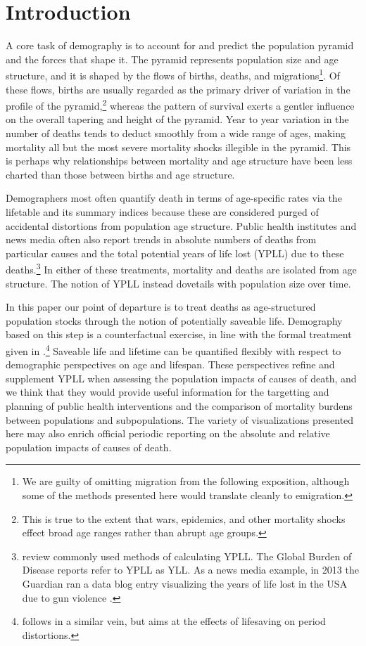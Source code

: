 \documentclass{article}
\begin{document}
\section*{Introduction}
A core task of demography is to account for and predict the population
pyramid and the forces that shape it. The pyramid represents population
size and age structure, and it is shaped by the flows of births,
deaths, and migrations\footnote{We are guilty of omitting migration from
the following exposition, although some of the methods presented here would
translate cleanly to emigration.}. Of these flows, births are usually regarded
as the primary driver of variation in the profile of the pyramid,\footnote{This
is true to the extent that wars, epidemics, and other mortality shocks effect
broad age ranges rather than abrupt age groups.} whereas the pattern of survival
exerts a gentler influence on the overall tapering and height of the pyramid.
Year to year variation in the number of deaths tends to deduct
smoothly from a wide range of ages, making mortality all but the most
severe mortality shocks illegible in the pyramid. This is perhaps why
relationships between mortality and age structure have been less charted than those between births and age structure.

Demographers most often quantify death in terms of age-specific rates via the
lifetable and its summary indices because these are considered purged of
accidental distortions from population age structure. Public health institutes and news media often also
report trends in absolute numbers of deaths from particular causes and the total potential years of life lost (YPLL) due to
these deaths.\footnote{\citet{gardner1990} review commonly used methods of
calculating YPLL. The Global Burden of Disease reports refer to YPLL as YLL.
As a news media example, in 2013 the Guardian ran a data blog entry
visualizing the years of life lost in the USA due to gun violence
\citep{rogers2013gun}. } In either of these treatments, mortality and deaths are
isolated from age structure. The notion of YPLL instead dovetails with
population size over time. 

In this paper our point of departure is to
treat deaths as age-structured population stocks through the notion of
potentially saveable life. Demography based on this step is a counterfactual exercise, in line with the formal treatment given in
\citet{vaupel1987repeated}.\footnote{\citet{vaupel2008lifesaving} follows in a
similar vein, but aims at the effects of lifesaving on period distortions.}
Saveable life and lifetime can be quantified flexibly with respect to demographic perspectives on age and lifespan. These perspectives refine and supplement YPLL when assessing the population impacts of causes of death, and we think that they would provide useful information for the targetting and planning
of public health interventions and the comparison of mortality burdens between
populations and subpopulations. The variety of visualizations presented here may
also enrich official periodic reporting on the absolute and relative population
impacts of causes of death.
\end{document}

